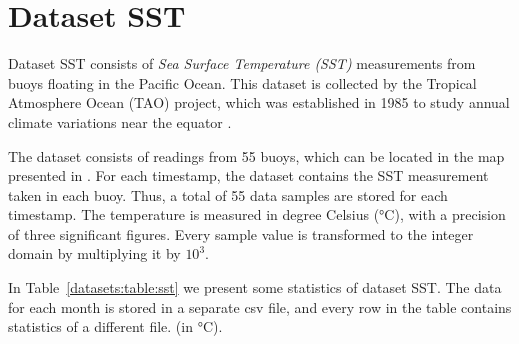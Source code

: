 

\vspace{-10pt}
\section{Dataset SST}
\label{datasets:sst}
\newcommand{\TAODef}{This dataset is collected by the Tropical Atmosphere Ocean (TAO) project, which was established in 1985 to study annual climate variations near the equator \cite{dataset:tao}.}

Dataset SST \cite{dataset:sst1} consists of \textit{Sea Surface Temperature (SST)} measurements from buoys floating in the Pacific Ocean. \TAODef


The dataset consists of readings from 55 buoys, which can be located in the map presented in \cite{dataset:sst1}. For each timestamp, the dataset contains the SST measurement taken in each buoy. Thus, a total of 55 data samples are stored for each timestamp. The temperature is measured in degree Celsius (°C), with a precision of three significant figures. Every sample value is transformed to the integer domain by multiplying it by $10^3$.


\clearpage


In Table~\ref{datasets:table:sst} we present some statistics of dataset SST. The data for each month is stored in a separate csv file, and every row in the table contains statistics of a different file. \commonTable (in °C).




